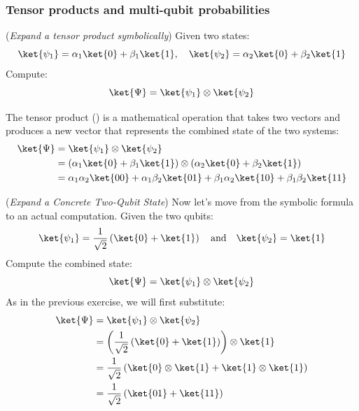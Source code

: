 \subsubsection{Tensor products and multi-qubit probabilities}\label{ex:tensor-products-and-multi-qubit-probabilities}

\exercise (\emph{Expand a tensor product symbolically}) Given two states:
\begin{equation*}
    \ket{\psi_{1}} = \alpha_1 \ket{0} + \beta_1 \ket{1}, \quad
    \ket{\psi_{2}} = \alpha_2 \ket{0} + \beta_2 \ket{1}
\end{equation*}
Compute:
\begin{equation*}
    \ket{\Psi} = \ket{\psi_1} \otimes \ket{\psi_2}
\end{equation*}

\highspace
\solution The tensor product () is a mathematical operation that takes two vectors and produces a new vector that represents the combined state of the two systems:
\begin{equation*}
    \begin{aligned}
        \ket{\Psi} &= \ket{\psi_1} \otimes \ket{\psi_2} \\
        &= \left(\alpha_1 \ket{0} + \beta_1 \ket{1}\right) \otimes \left(\alpha_2 \ket{0} + \beta_2 \ket{1}\right) \\
        &= \alpha_1 \alpha_2 \ket{00} + \alpha_1 \beta_2 \ket{01} + \beta_1 \alpha_2 \ket{10} + \beta_1 \beta_2 \ket{11}
    \end{aligned}
\end{equation*}

\highspace
\exercise (\emph{Expand a Concrete Two-Qubit State}) Now let's move from the symbolic formula to an actual computation. Given the two qubits:
\begin{equation*}
    \ket{\psi_1} = \frac{1}{\sqrt{2}}\left(\ket{0} + \ket{1}\right) \quad \text{and} \quad \ket{\psi_2} = \ket{1}
\end{equation*}
Compute the combined state:
\begin{equation*}
    \ket{\Psi} = \ket{\psi_1} \otimes \ket{\psi_2}
\end{equation*}
\solution As in the previous exercise, we will first substitute:
\begin{equation*}
    \begin{aligned}
        \ket{\Psi} &= \ket{\psi_1} \otimes \ket{\psi_2} \\
        &= \left(\frac{1}{\sqrt{2}}\left(\ket{0} + \ket{1}\right)\right) \otimes \ket{1} \\
        &= \frac{1}{\sqrt{2}}\left(\ket{0} \otimes \ket{1} + \ket{1} \otimes \ket{1}\right) \\
        &= \frac{1}{\sqrt{2}}\left(\ket{01} + \ket{11}\right)
    \end{aligned}
\end{equation*}

